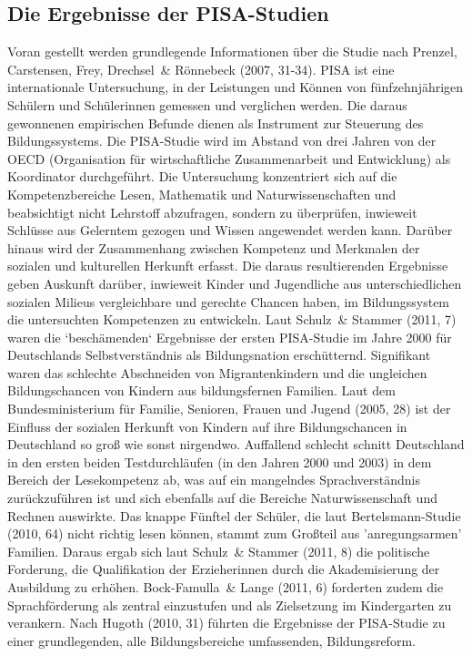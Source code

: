 \subsection{Die Ergebnisse der PISA-Studien}
Voran gestellt werden grundlegende Informationen über die Studie nach Prenzel, Carstensen, Frey, Drechsel~\& Rönnebeck (2007, 31-34). PISA ist eine internationale Untersuchung, in der Leistungen und Können von fünfzehnjährigen Schülern und Schülerinnen gemessen und verglichen werden. Die daraus gewonnenen empirischen Befunde dienen als Instrument zur Steuerung des Bildungssystems. Die PISA-Studie wird im Abstand von drei Jahren von der OECD (Organisation für wirtschaftliche Zusammenarbeit und Entwicklung) als Koordinator durchgeführt. Die Untersuchung konzentriert sich auf die Kompetenzbereiche Lesen, Mathematik und Naturwissenschaften und beabsichtigt nicht Lehrstoff abzufragen, sondern zu überprüfen, inwieweit Schlüsse aus Gelerntem gezogen und Wissen angewendet werden kann. Darüber hinaus wird der Zusammenhang zwischen Kompetenz und Merkmalen der sozialen und kulturellen Herkunft erfasst. Die daraus resultierenden Ergebnisse geben Auskunft darüber, inwieweit Kinder und Jugendliche aus unterschiedlichen sozialen Milieus vergleichbare und gerechte Chancen haben, im Bildungssystem die untersuchten Kompetenzen zu entwickeln. 
Laut Schulz~\& Stammer (2011, 7) waren die ‘beschämenden‘ Ergebnisse der ersten PISA-Studie im Jahre 2000 für Deutschlands Selbstverständnis als Bildungsnation erschütternd. Signifikant waren das schlechte Abschneiden von Migrantenkindern und die ungleichen Bildungschancen von Kindern aus bildungsfernen Familien. Laut dem Bundesministerium für Familie, Senioren, Frauen und Jugend (2005, 28) ist der Einfluss der sozialen Herkunft von Kindern auf ihre Bildungschancen in Deutschland so groß wie sonst nirgendwo. Auffallend schlecht schnitt Deutschland in den ersten beiden Testdurchläufen (in den Jahren 2000 und 2003) in dem Bereich der Lesekompetenz ab, was auf ein mangelndes Sprachverständnis zurückzuführen ist und sich ebenfalls auf die Bereiche Naturwissenschaft und Rechnen auswirkte. Das knappe Fünftel der Schüler, die laut Bertelsmann-Studie (2010, 64) nicht richtig lesen können, stammt zum Großteil aus 'anregungsarmen' Familien. 
Daraus ergab sich laut Schulz~\& Stammer (2011, 8) die politische Forderung, die Qualifikation der Erzieherinnen durch die Akademisierung der Ausbildung zu erhöhen. Bock-Famulla~\& Lange (2011, 6) forderten zudem die Sprachförderung als zentral einzustufen und als Zielsetzung im Kindergarten zu verankern. Nach Hugoth (2010, 31) führten die Ergebnisse der PISA-Studie zu einer grundlegenden, alle Bildungsbereiche umfassenden, Bildungsreform.
 
